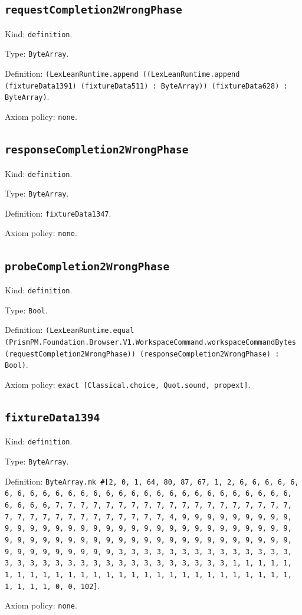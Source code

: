 \documentclass[11pt]{article}
\begin{document}
\subsection*{\texttt{requestCompletion2WrongPhase}}
\noindent Kind: \texttt{definition}.\par
\noindent Type: \texttt{ByteArray}.\par
\noindent Definition: \texttt{(LexLeanRuntime.append ((LexLeanRuntime.append (fixtureData1391) (fixtureData511) : ByteArray)) (fixtureData628) : ByteArray)}.\par
\noindent Axiom policy: \texttt{none}.\par
\subsection*{\texttt{responseCompletion2WrongPhase}}
\noindent Kind: \texttt{definition}.\par
\noindent Type: \texttt{ByteArray}.\par
\noindent Definition: \texttt{fixtureData1347}.\par
\noindent Axiom policy: \texttt{none}.\par
\subsection*{\texttt{probeCompletion2WrongPhase}}
\noindent Kind: \texttt{definition}.\par
\noindent Type: \texttt{Bool}.\par
\noindent Definition: \texttt{(LexLeanRuntime.equal (PrismPM.Foundation.Browser.V1.WorkspaceCommand.workspaceCommandBytes (requestCompletion2WrongPhase)) (responseCompletion2WrongPhase) : Bool)}.\par
\noindent Axiom policy: \texttt{exact [Classical.choice, Quot.sound, propext]}.\par
\subsection*{\texttt{fixtureData1394}}
\noindent Kind: \texttt{definition}.\par
\noindent Type: \texttt{ByteArray}.\par
\noindent Definition: \texttt{ByteArray.mk \#[2, 0, 1, 64, 80, 87, 67, 1, 2, 6, 6, 6, 6, 6, 6, 6, 6, 6, 6, 6, 6, 6, 6, 6, 6, 6, 6, 6, 6, 6, 6, 6, 6, 6, 6, 6, 6, 6, 6, 6, 6, 7, 7, 7, 7, 7, 7, 7, 7, 7, 7, 7, 7, 7, 7, 7, 7, 7, 7, 7, 7, 7, 7, 7, 7, 7, 7, 7, 7, 7, 7, 7, 7, 4, 9, 9, 9, 9, 9, 9, 9, 9, 9, 9, 9, 9, 9, 9, 9, 9, 9, 9, 9, 9, 9, 9, 9, 9, 9, 9, 9, 9, 9, 9, 9, 9, 9, 9, 9, 9, 9, 9, 9, 9, 9, 9, 9, 9, 9, 9, 9, 9, 9, 9, 9, 9, 9, 9, 9, 9, 9, 9, 9, 9, 9, 9, 9, 9, 3, 3, 3, 3, 3, 3, 3, 3, 3, 3, 3, 3, 3, 3, 3, 3, 3, 3, 3, 3, 3, 3, 3, 3, 3, 3, 3, 3, 3, 3, 3, 3, 1, 1, 1, 1, 1, 1, 1, 1, 1, 1, 1, 1, 1, 1, 1, 1, 1, 1, 1, 1, 1, 1, 1, 1, 1, 1, 1, 1, 1, 1, 1, 1, 0, 0, 102]}.\par
\noindent Axiom policy: \texttt{none}.\par
\end{document}
